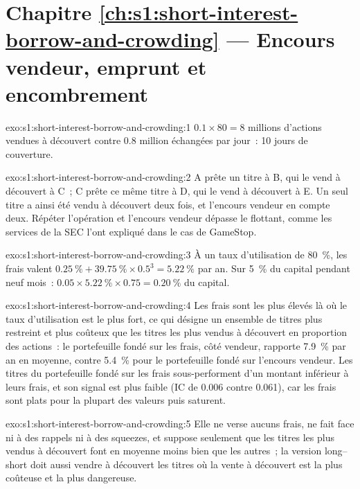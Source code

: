 \section*{Chapitre \ref{ch:s1:short-interest-borrow-and-crowding} --- Encours vendeur, emprunt et encombrement}

\begin{solution}{exo:s1:short-interest-borrow-and-crowding:1}
$0.1 \times 80 = 8$ millions d'actions vendues à découvert contre 0.8 million échangées par jour~: 10 jours de couverture.
\end{solution}

\begin{solution}{exo:s1:short-interest-borrow-and-crowding:2}
A prête un titre à B, qui le vend à découvert à C~; C prête ce même titre à D, qui le vend à découvert à E. Un seul titre a ainsi été vendu à découvert deux fois, et l'encours vendeur
en compte deux. Répéter l'opération et l'encours vendeur dépasse le flottant, comme les services de la SEC l'ont expliqué dans le cas de GameStop.
\end{solution}

\begin{solution}{exo:s1:short-interest-borrow-and-crowding:3}
À un taux d'utilisation de 80~\%, les frais valent $0.25~\% + 39.75~\% \times 0.5^3 = 5.22~\%$ par an. Sur 5~\% du capital pendant neuf mois~: $0.05 \times 5.22~\% \times 0.75 = 0.20~\%$ du
capital.
\end{solution}

\begin{solution}{exo:s1:short-interest-borrow-and-crowding:4}
Les frais sont les plus élevés là où le taux d'utilisation est le plus fort, ce qui désigne un ensemble de titres plus restreint et plus coûteux que les titres les plus vendus à découvert en proportion des actions~: le portefeuille
fondé sur les frais, côté vendeur, rapporte 7.9~\% par an en moyenne, contre 5.4~\% pour le portefeuille fondé sur l'encours vendeur. Les titres du portefeuille fondé sur les frais sous-performent d'un montant inférieur à leurs frais, et son
signal est plus faible (IC de 0.006 contre 0.061), car les frais sont plats pour la plupart des valeurs puis saturent.
\end{solution}

\begin{solution}{exo:s1:short-interest-borrow-and-crowding:5}
Elle ne verse aucuns frais, ne fait face ni à des rappels ni à des squeezes, et suppose seulement que les titres les plus vendus à découvert font en moyenne moins bien que les autres~; la version long--short doit
aussi vendre à découvert les titres où la vente à découvert est la plus coûteuse et la plus dangereuse.
\end{solution}

